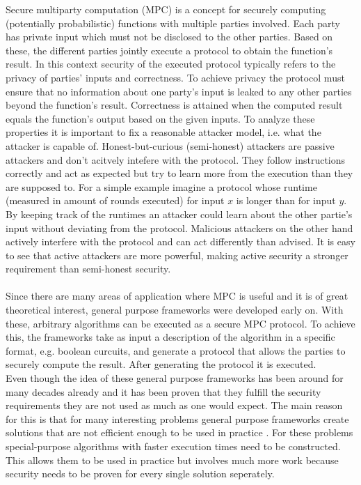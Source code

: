 Secure multiparty computation (MPC) is a concept for securely computing (potentially probabilistic) functions with multiple parties involved. Each party has private input which must not be disclosed to the other parties. Based on these, the different parties jointly execute a protocol to obtain the function's result. In this context security of the executed protocol typically refers to the privacy of parties' inputs and correctness. To achieve privacy the protocol must ensure that no information about one party's input is leaked to any other parties beyond the function's result. Correctness is attained when the computed result equals the function's output based on the given inputs. To analyze these properties it is important to fix a reasonable attacker model, i.e. what the attacker is capable of. Honest-but-curious (semi-honest) attackers are passive attackers and don't acitvely intefere with the protocol. They follow instructions correctly and act as expected but try to learn more from the execution than they are supposed to. For a simple example imagine a protocol whose runtime (measured in amount of rounds executed) for input $x$ is longer than for input $y$. By keeping track of the runtimes an attacker could learn about the other partie's input without deviating from the protocol. Malicious attackers on the other hand actively interfere with the protocol and can act differently than advised. It is easy to see that active attackers are more powerful, making active security a stronger requirement than semi-honest security.\\
\ \\Since there are many areas of application where MPC is useful and it is of great theoretical interest, general purpose frameworks were developed early on. With these, arbitrary algorithms can be executed as a secure MPC protocol. To achieve this, the frameworks take as input a description of the algorithm in a specific format, e.g. boolean curcuits, and generate a protocol that allows the parties to securely compute the result. After generating the protocol it is executed.\\ 
Even though the idea of these general purpose frameworks has been around for many decades already and it has been proven that they fulfill the security requirements they are not used as much as one would expect. The main reason for this is that for many interesting problems general purpose frameworks create solutions that are not efficient enough to be used in practice \citep{sok, mpusp, htpamg, htgaes}. For these problems special-purpose algorithms with faster execution times need to be constructed. This allows them to be used in practice but involves much more work because security needs to be proven for every single solution seperately. \\
